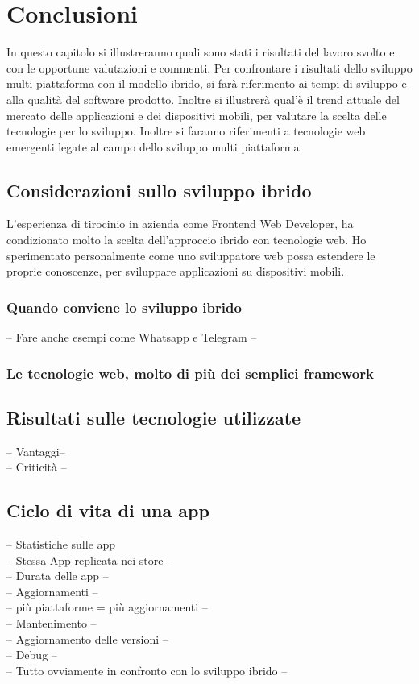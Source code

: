 \chapter{Conclusioni}

In questo capitolo si illustreranno quali sono stati i risultati del lavoro svolto e con le opportune valutazioni e commenti. Per confrontare i risultati dello sviluppo multi piattaforma con il modello ibrido, si farà riferimento ai tempi di sviluppo e alla qualità del software prodotto. Inoltre si illustrerà qual'è il trend attuale del mercato delle applicazioni e dei dispositivi mobili, per valutare la scelta delle tecnologie per lo sviluppo. Inoltre si faranno riferimenti a tecnologie web emergenti legate al campo dello sviluppo multi piattaforma.

\section{Considerazioni sullo sviluppo ibrido}
L'esperienza di tirocinio in azienda come Frontend Web Developer, ha condizionato molto la scelta dell'approccio ibrido con tecnologie web. Ho sperimentato personalmente come uno sviluppatore web possa estendere le proprie conoscenze, per sviluppare applicazioni su dispositivi mobili.

\subsection{Quando conviene lo sviluppo ibrido}

-- Fare anche esempi come Whatsapp e Telegram --\\

\subsection{Le tecnologie web, molto di più dei semplici framework}

\section{Risultati sulle tecnologie utilizzate}

-- Vantaggi-- \\
-- Criticità --\\


\section{Ciclo di vita di una app}
-- Statistiche sulle app\\
	-- Stessa App replicata nei store --\\
	-- Durata delle app --\\
-- Aggiornamenti --\\
	-- più piattaforme = più aggiornamenti --\\
-- Mantenimento --\\
	-- Aggiornamento delle versioni --\\
	-- Debug --\\
-- Tutto ovviamente in confronto con lo sviluppo ibrido --

